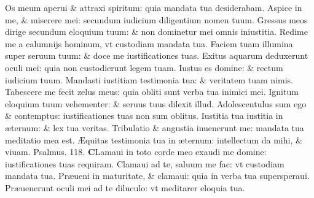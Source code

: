 \documentclass[a5paper,10pt]{book}
\def\ae{æ}
\def\AE{Æ}
\begin{document}
\begin{multicols*}{2}
\newline \color{red} O\color{black}s meum aperui \& attraxi spiritum: quia mandata tua desiderabam.
\newline \color{red} A\color{black}spice in me, \& miserere mei: secundum iudicium diligentium nomen tuum.
\newline \color{red} G\color{black}ressus meos dirige secundum eloquium tuum: \& non dominetur mei omnis iniustitia.
\newline \color{red} R\color{black}edime me a calumnijs hominum, vt custodiam mandata tua.
\newline \color{red} F\color{black}aciem tuam illumina super seruum tuum: \& doce me iustificationes tuas.
\newline \color{red} E\color{black}xitus aquarum deduxerunt oculi mei: quia non custodierunt legem tuam.
\newline \color{red} I\color{black}ustus es domine: \& rectum iudicium tuum.
\newline \color{red} M\color{black}andasti iustitiam testimonia tua: \& veritatem tuam nimis.
\newline \color{red} T\color{black}abescere me fecit zelus meus: quia obliti sunt verba tua inimici mei.
\newline \color{red} I\color{black}gnitum eloquium tuum vehementer: \& seruus tuus dilexit illud.
\newline \color{red} A\color{black}dolescentulus sum ego \& contemptus: iustificationes tuas non sum oblitus.
\newline \color{red} I\color{black}ustitia tua iustitia in \ae ternum: \& lex tua veritas.
\newline \color{red} T\color{black}ribulatio \& angustia inuenerunt me: mandata tua meditatio mea est.
\newline \color{red} \AE \color{black}quitas testimonia tua in \ae ternum: intellectum da mihi, \& viuam. \quad \color{red} Psalmus. 118. \color{black}
\vspace{-.5em}
\lettrine[lines=2]{\bfseries \color{red} C}{}Lamaui in toto corde meo exaudi me domine: iustificationes tuas requiram.
\newline \color{red} C\color{black}lamaui ad te, saluum me fac: vt custodiam mandata tua.
\newline \color{red} P\color{black}r\ae ueni in maturitate, \& clamaui: quia in verba tua supersperaui.
\newline \color{red} P\color{black}r\ae uenerunt oculi mei ad te diluculo: vt meditarer eloquia tua.

\end{multicols*}
\end{document}
